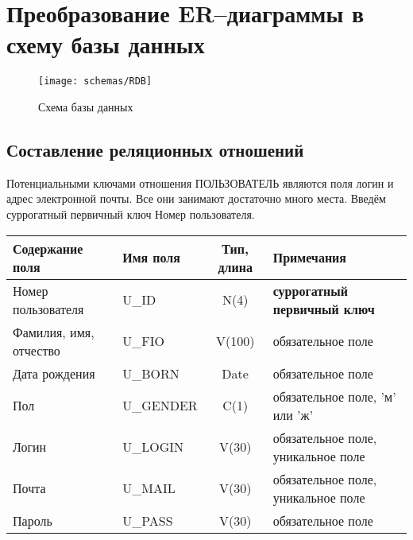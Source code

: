 \documentclass[a4paper,14pt]{article}
\begin{document}
\section{Преобразование ER–диаграммы в схему базы данных}

\begin{figure}[H]
	\centering		
	\texttt{[image: schemas/RDB]}
	\caption{Схема базы данных}\label{img:RDB}
\end{figure}

\subsection{Составление реляционных отношений}



Потенциальными ключами отношения ПОЛЬЗОВАТЕЛЬ являются поля логин и адрес электронной почты. Все они занимают достаточно много места. Введём суррогатный первичный ключ Номер пользователя.

\begin{table}[H]
	\begin{flushleft} 
	\end{flushleft}
\begin{adjustbox}{width=\linewidth}
\begin{tabular}{|l|l|c|l|}
	\hline
	Содержание поля        & Имя поля  & Тип, длина & Примечания                          \\ \hline
	Номер пользователя     & U\_ID     &    N(4)    & \textbf{суррогатный первичный ключ} \\ \hline
	Фамилия, имя, отчество & U\_FIO    &   V(100)   & обязательное поле                   \\ \hline
	Дата рождения          & U\_BORN   &    Date    & обязательное поле                   \\ \hline
	Пол                    & U\_GENDER &    C(1)    & обязательное поле, 'м' или 'ж'      \\ \hline
	Логин                  & U\_LOGIN  &   V(30)    & обязательное поле, уникальное поле  \\ \hline
	Почта                  & U\_MAIL   &   V(30)    & обязательное поле, уникальное поле  \\ \hline
	Пароль                 & U\_PASS   &   V(30)    & обязательное поле                   \\ \hline
\end{tabular}
\end{adjustbox}
\end{table}
\end{document}
